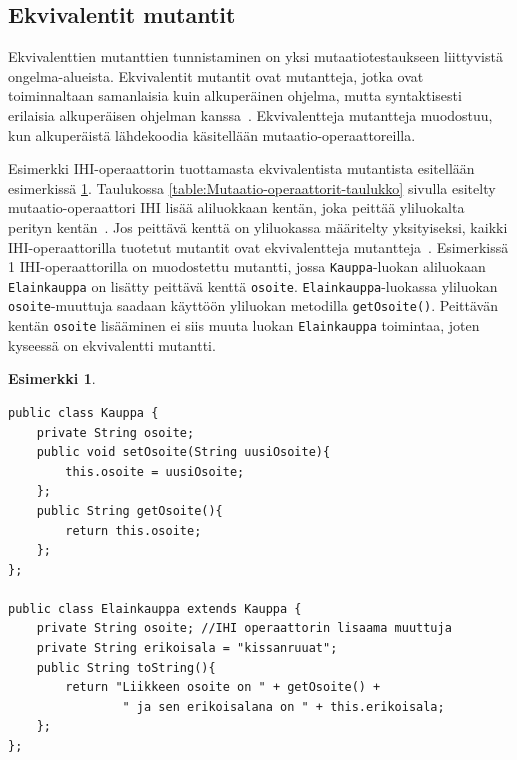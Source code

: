 \documentclass[finnish, grading]{tktltiki2}
\theoremstyle{definition}
\newtheorem{esim}[lau]{Esimerkki}
\theoremstyle{remark}
\begin{document}

\subsection{Ekvivalentit mutantit}

Ekvivalenttien mutanttien tunnistaminen on yksi mutaatiotestaukseen liittyvistä ongelma-alueista. Ekvivalentit mutantit ovat mutantteja, jotka ovat toiminnaltaan samanlaisia kuin alkuperäinen ohjelma, mutta syntaktisesti erilaisia alkuperäisen ohjelman kanssa~\cite[s. 652]{Jia:Harman:2011}. Ekvivalentteja mutantteja muodostuu, kun alkuperäistä lähdekoodia käsitellään mutaatio-operaattoreilla. 

Esimerkki IHI-operaattorin tuottamasta ekvivalentista mutantista esitellään esimerkissä \ref{esim:IHIEkvivalenttiMutantti}. Taulukossa \ref{table:Mutaatio-operaattorit-taulukko} sivulla \pageref{table:Mutaatio-operaattorit-taulukko} esitelty mutaatio-operaattori IHI lisää aliluokkaan kentän, joka peittää yliluokalta perityn kentän~\cite[s. 80]{Offutt:Ma:Kwon:2006:MuClassLevel}. Jos peittävä kenttä on yliluokassa määritelty yksityiseksi, kaikki IHI-operaattorilla tuotetut mutantit ovat ekvivalentteja mutantteja~\cite[s. 80]{Offutt:Ma:Kwon:2006:MuClassLevel}. Esimerkissä 1 IHI-operaattorilla on muodostettu mutantti, jossa \texttt{Kauppa}-luokan aliluokaan \texttt{Elainkauppa} on lisätty peittävä kenttä \texttt{osoite}. \texttt{Elainkauppa}-luokassa yliluokan \texttt{osoite}-muuttuja saadaan käyttöön yliluokan metodilla \texttt{getOsoite()}. Peittävän kentän \texttt{osoite} lisääminen ei siis muuta luokan \texttt{Elainkauppa} toimintaa, joten kyseessä on ekvivalentti mutantti. 

\begin{esim}
\vspace{1\baselineskip}\noindent
\begin{lstlisting} 
public class Kauppa {
	private String osoite;
	public void setOsoite(String uusiOsoite){
		this.osoite = uusiOsoite;
	};
	public String getOsoite(){
		return this.osoite;
	};
};

public class Elainkauppa extends Kauppa {
	private String osoite; //IHI operaattorin lisaama muuttuja
	private String erikoisala = "kissanruuat";
	public String toString(){
		return "Liikkeen osoite on " + getOsoite() +
		        " ja sen erikoisalana on " + this.erikoisala;
	};
};
\end{lstlisting}
\label{esim:IHIEkvivalenttiMutantti}
\end{esim}
\end{document}
